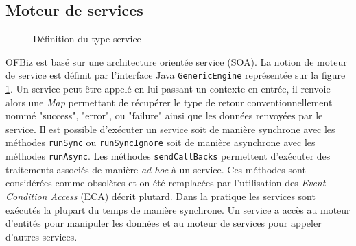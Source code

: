 \documentclass[a4paper, 11pt]{report}
\begin{document}
\subsection{Moteur de services}

\begin{figure}
  \centering
  \caption{Définition du type service}
  \label{fig:serviceengine}
\end{figure}

OFBiz est basé sur une architecture orientée service (SOA). La notion
de moteur de service est définit par l'interface Java
\verb=GenericEngine= représentée sur la figure \ref{fig:serviceengine}.
Un service peut être appelé en lui passant un contexte en entrée, il
renvoie alors une \emph{Map} permettant de récupérer le type de retour
conventionnellement nommé "success", "error", ou "failure" ainsi que les
données renvoyées par le service. Il est possible d'exécuter un
service soit de manière synchrone avec les méthodes \verb=runSync= ou
\verb=runSyncIgnore= soit de manière asynchrone avec les méthodes
\verb=runAsync=. Les méthodes \verb=sendCallBacks= permettent
d'exécuter des traitements associés de manière \emph{ad hoc} à un
service. Ces méthodes sont considérées comme obsolètes et on été
remplacées par l'utilisation des \emph{Event Condition Access} (ECA)
décrit plutard. Dans la pratique les services sont exécutés la plupart
du temps de manière synchrone. Un service a accès au moteur d'entités
pour manipuler les données et au moteur de services pour appeler
d'autres services.
\end{document}
